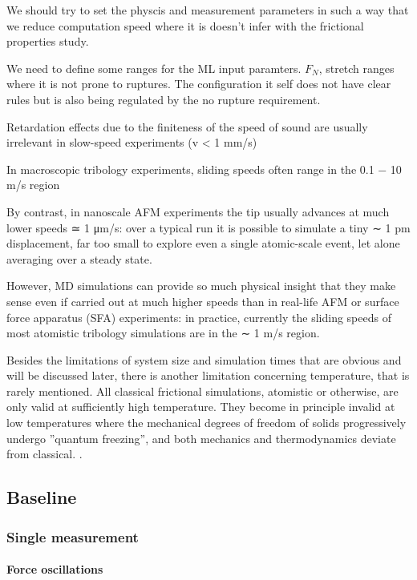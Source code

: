 We should try to set the physcis and measurement parameters in such a way that we reduce computation speed where it is doesn't infer with the frictional properties study.

We need to define some ranges for the ML input paramters. $F_N$, stretch ranges where it is not prone to ruptures. The configuration it self does not have clear rules but is also being regulated by the no rupture requirement. 

Retardation effects due to the finiteness of the speed of sound are usually irrelevant in slow-speed experiments (v < 1 mm/s) \cite{Manini_2016}

In macroscopic tribology experiments, sliding speeds often range in the 0.1 − 10 m/s region \cite{Manini_2016}

By contrast, in nanoscale AFM experiments the tip usually advances at much lower speeds ≃ 1 μm/s: over a typical run it is possible to simulate a tiny ∼ 1 pm displacement, far too small to explore even a single atomic-scale event, let alone averaging over a steady state.\cite{Manini_2016}


However, MD simulations can provide so much physical insight that they make sense even if carried out at much higher speeds than in real-life AFM or surface force apparatus (SFA) experiments: in practice, currently the sliding speeds of most atomistic tribology simulations are in the ∼ 1 m/s region.\cite{Manini_2016}


Besides the limitations of system size and simulation times that are obvious and will be discussed later, there is another limitation concerning temperature, that is rarely mentioned. All classical frictional simulations, atomistic or otherwise, are only valid at sufficiently high temperature. They become in principle invalid at low temperatures where the mechanical degrees of freedom of solids progressively undergo ”quantum freezing”, and both mechanics and thermodynamics deviate from classical. \cite{Manini_2016}.

\newpage
\subsection{Baseline}

\subsubsection{Single measurement}
\paragraph*{Force oscillations}

